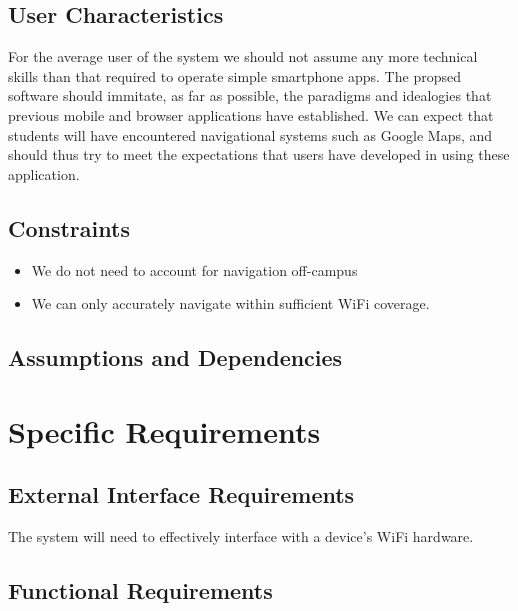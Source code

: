 \documentclass[10pt,a4paper]{article}
\begin{document}
		\subsection{User Characteristics}

			For the average user of the system we should not assume any more technical
			skills than that required to operate simple smartphone apps. The propsed
			software should immitate, as far as possible, the paradigms and idealogies
			that previous mobile and browser applications have established. We can
			expect that students will have encountered navigational systems such as
			Google Maps, and should thus try to meet the expectations that users have
			developed in using these application.

		\subsection{Constraints}

			\begin{itemize}

				\item We do not need to account for navigation off-campus
				\item We can only accurately navigate within sufficient WiFi coverage.

			\end{itemize}

		\subsection{Assumptions and Dependencies}



	\section{Specific Requirements}

		\subsection{External Interface Requirements}

			The system will need to effectively interface with a device's WiFi
			hardware.

		\subsection{Functional Requirements}
\end{document}
